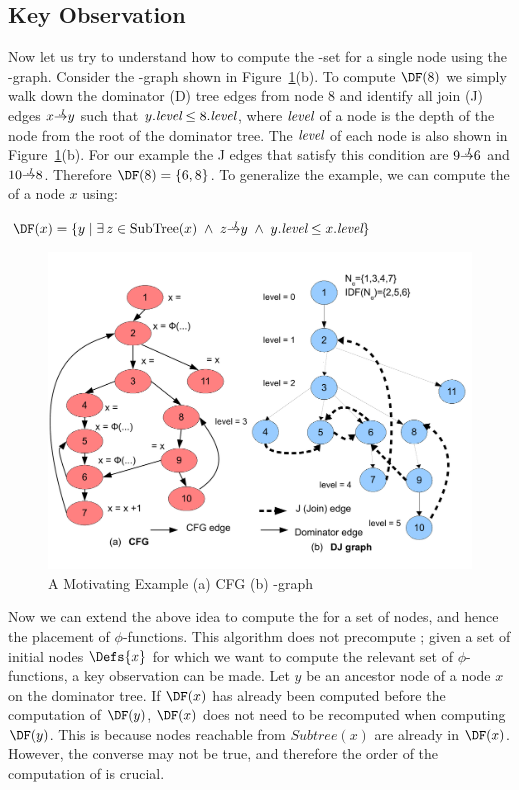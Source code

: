 {\subsection{Key Observation} 
 
Now let us try to understand how to compute the \DF-set for a single node using the \DJ-graph. 
Consider  the \DJ-graph shown in Figure~\ref{fig:cfg}(b). To compute $\DF(8)$ we simply walk down the
dominator (D) tree edges from node 8 and identify all join (J) edges $x \st{J} y$ such
that $y.\textit{level} \leq 8.\textit{level}$, where $\textit{level}$ of a node is the depth of the node from the
root of the dominator tree. The $\textit{level}$ of each node is also shown in Figure~\ref{fig:cfg}(b).
For our example the J edges that satisfy this 
condition are $9 \st{J} 6$ and $10 \st{J} 8$. Therefore $\DF(8) = \{6, 8\}$. To generalize the example, we can
compute the \DF of a node $x$ using:
\begin{center}
  $\DF(x) = \{y\mid\exists\, z \in {\rm SubTree}(x) \; \wedge \; z \st{J} y \; 
  \wedge \; y.\level \leq x.\level \}$
\end{center}

    \begin{figure}[htb]
    \centerline{\includegraphics[scale=0.4]{cfglive_new.pdf}}
    \caption{A Motivating Example (a) CFG (b) \DJ-graph}
    \label{fig:cfg}
    \end{figure} 

Now we can extend the above idea to compute the \iDF for a set of nodes, and 
hence the placement of $\phi$-functions. This algorithm does not precompute \DF; given a set of initial nodes $\Defs{x}$ for which we want to compute the relevant set of $\phi$-functions,
a key observation can be made. Let $y$ be an ancestor node of a node $x$ on the 
dominator tree. If $\DF(x)$ has already been computed before the computation of 
$\DF(y)$,  $\DF(x)$ does not need to
be recomputed when computing $\DF(y)$. This is because nodes reachable from 
$\textit{Subtree}(x)$ are already in $\DF(x)$. However, the converse may not be true, and  therefore the order of the computation of \DF is crucial.

}
